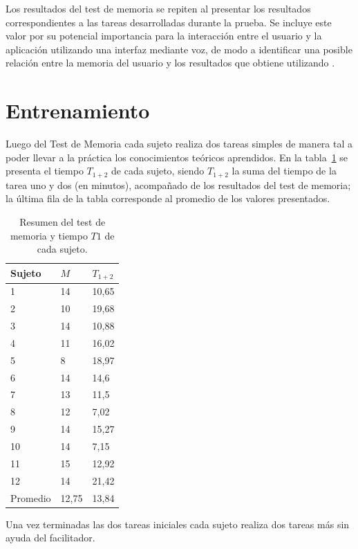 Los resultados del test de memoria se repiten al presentar los resultados correspondientes a las tareas 
desarrolladas durante la prueba. 
Se incluye este valor por su potencial importancia para la interacci\'on entre el usuario
y la aplicaci\'on utilizando una interfaz mediante voz, de modo a identificar una posible relaci\'on
entre la memoria del usuario y los resultados que obtiene utilizando \mbox{.}
 
\section{Entrenamiento}

Luego del Test de Memoria cada sujeto realiza dos tareas simples de manera tal a poder 
llevar a la pr\'actica los conocimientos te\'oricos aprendidos.
En la tabla~\ref{sec:tabla-t1-memoria} se presenta el tiempo $T_{1+2}$ de
cada sujeto, siendo $T_{1+2}$ la suma del tiempo de la tarea uno y dos (en minutos), acompa\~nado
de los resultados del test de memoria; la \'ultima fila de la tabla corresponde al promedio de los valores
presentados.

\begin{table}[H]
\centering
\footnotesize
\begin{tabular}{|p{1.6cm}|p{1.6cm}|p{1.6cm}|}
\hline
    Sujeto & $M$ & $T_{1+2}$ \\
    \hline 
    1 & 14 & 10,65 \\
    2 & 10 & 19,68 \\
    3 & 14 & 10,88 \\
    4 & 11 & 16,02 \\
    5 & 8 & 18,97 \\
    6 & 14 & 14,6 \\
    7 & 13 & 11,5 \\
    8 & 12 & 7,02 \\
    9 & 14 & 15,27 \\
    10 & 14 & 7,15 \\
    11 & 15 & 12,92 \\
    12 & 14 & 21,42 \\
\hline
    Promedio &  12,75 & 13,84  \\
\hline
\end{tabular}
\caption{Resumen del test de memoria y tiempo $T1$ de cada sujeto.}
\label{sec:tabla-t1-memoria}
\end{table}

Una vez terminadas las dos tareas iniciales cada sujeto realiza dos tareas m\'as sin ayuda del 
facilitador.

